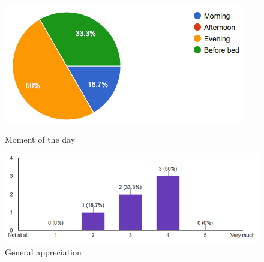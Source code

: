 \begin{figure}[!ht]
	\centering
	\begin{minipage}{.5\textwidth}
		\centering
		\includegraphics[scale=0.4]{Figures/responses/application_period_of_usage.png}
		\caption{Moment of the day}
		\label{fig:application_period_of_usage}
	\end{minipage}%
	\begin{minipage}{.5\textwidth}
		\centering
		\includegraphics[scale=0.4]{Figures/responses/application_liked.png}
		\caption{General appreciation}
		\label{fig:application_liked}
	\end{minipage}%
\end{figure}

